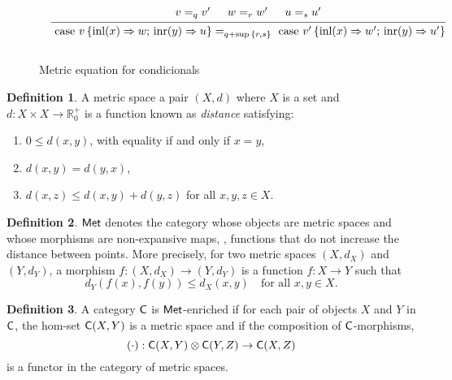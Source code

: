\documentclass[10pt,a4paper]{amsart}
\theoremstyle{definition}
\newtheorem{definition}{Definition}[section]
\theoremstyle{definition}
\theoremstyle{definition}
\theoremstyle{definition}
\theoremstyle{definition}
\theoremstyle{definition}
\begin{document}
\begin{figure}[H]
  \begin{equation*}
  \begin{aligned}
  &
  &
  \begin{prooftree}
      \hypo{ v =_{q} v' }
      \hypo{w=_{r} w'}
      \hypo{u=_{s}u'}
      \infer3[]{\text{ case } v \,   \{\text{inl} (x) \Rightarrow w ; \, \text{inr} (y) \Rightarrow u\} =_{q+\sup{\{ r, s \}}} \text{ case } v' \,  \{\text{inl} (x) \Rightarrow w' ; \,\text{inr} (y) \Rightarrow u'\} }
  \end{prooftree}
  \\[10pt]
  \end{aligned}
  \end{equation*}
  \caption{Metric equation for condicionals}
  \label{fig:metric conditionals}
\end{figure}



  \begin{definition}
    A metric space a pair $(X, d)$ where $X$ is a set and $d: X \times X \to \mathbb{R}_0^+$ is a function known as \emph{distance} satisfying:
    \begin{enumerate}
        \item $0 \leq d(x, y)$, with equality if and only if $x = y$,
        \item $d(x, y) = d(y, x)$,
        \item $d(x, z) \leq d(x, y) + d(y, z)$ for all $x, y, z \in X$.
    \end{enumerate}
  \end{definition}
  
  \begin{definition}
    $\mathsf{Met}$ denotes the category whose objects are metric spaces and whose morphisms are non-expansive maps, \ie, functions that do not increase the distance between points. More precisely, for two metric spaces $(X, d_X)$ and $(Y, d_Y)$, a morphism $f: (X, d_X) \to (Y, d_Y)$ is a function $f: X \to Y$ such that
$$
d_Y(f(x), f(y)) \leq d_X(x, y) \quad \text{for all } x, y \in X.
$$
  \end{definition}
    


\begin{definition}
 A category $\mathsf{C}$ is $\mathsf{Met}$-enriched if for each pair of objects $X$ and $Y$ in $\mathsf{C}$, the hom-set $\mathsf{C}(X, Y)$ is a metric space and  if the composition of $\mathsf{C}$-morphisms,
 $$(\cdot): \mathsf{C}(X, Y) \otimes \mathsf{C}(Y, Z) \rightarrow \mathsf{C}(X, Z)$$
 is a functor in the category of metric spaces.
\end{definition}
\end{document}
